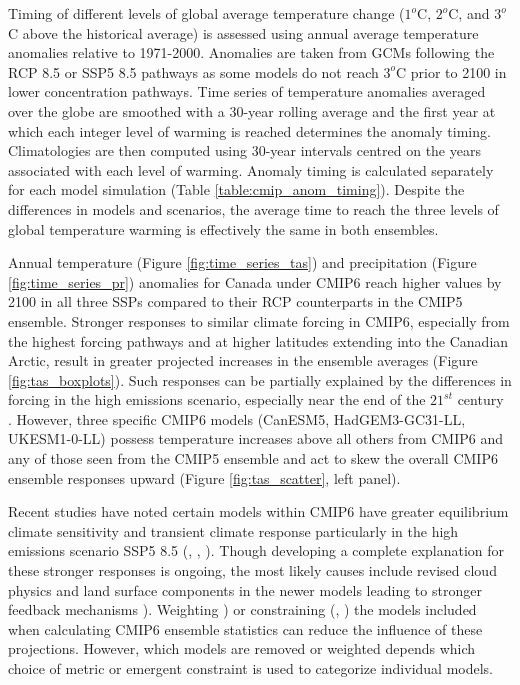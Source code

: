 \documentclass[]{scrartcl}
\begin{document}
Timing of different levels of global average temperature change ($1^o$C, $2^o$C, and $3^o$C above the historical average) is assessed using annual average temperature anomalies relative to 1971-2000. Anomalies are taken from GCMs following the RCP 8.5 or SSP5 8.5 pathways as some models do not reach $3^o$C prior to 2100 in lower concentration pathways. Time series of temperature anomalies averaged over the globe are smoothed with a 30-year rolling average and the first year at which each integer level of warming is reached determines the anomaly timing. Climatologies are then computed using 30-year intervals centred on the years associated with each level of warming. Anomaly timing is calculated separately for each model simulation (Table \ref{table:cmip_anom_timing}). Despite the differences in models and scenarios, the average time to reach the three levels of global temperature warming is effectively the same in both ensembles. 

Annual temperature (Figure \ref{fig:time_series_tas}) and precipitation (Figure \ref{fig:time_series_pr}) anomalies for Canada under CMIP6 reach higher values by 2100 in all three SSPs compared to their RCP counterparts in the CMIP5 ensemble. Stronger responses to similar climate forcing in CMIP6, especially from the highest forcing pathways and at higher latitudes extending into the Canadian Arctic, result in greater projected increases in the ensemble averages (Figure \ref{fig:tas_boxplots}). Such responses can be partially explained by the differences in forcing in the high emissions scenario, especially near the end of the $21^{st}$ century \citep{oneill_scenario_2016}. However, three specific CMIP6 models (CanESM5, HadGEM3-GC31-LL, UKESM1-0-LL) possess temperature increases above all others from CMIP6 and any of those seen from the CMIP5 ensemble and act to skew the overall CMIP6 ensemble responses upward (Figure \ref{fig:tas_scatter}, left panel).

Recent studies have noted certain models within CMIP6 have greater equilibrium climate sensitivity and transient climate response particularly in the high emissions scenario SSP5 8.5 (\citealt{Tokarska2020}, \citealt{Liang2020}, \citealt{Brunner2020}). Though developing a complete explanation for these stronger responses is ongoing, the most likely causes include revised cloud physics and land surface components in the newer models leading to stronger feedback mechanisms \citep{swart_canadian_2019}). Weighting \citep{Brunner2020}) or constraining (\citealt{Tokarska2020}, \citealt{Liang2020}) the models included when calculating CMIP6 ensemble statistics can reduce the influence of these projections. However, which models are removed or weighted depends which choice of metric or emergent constraint is used to categorize individual models. 
\end{document}
